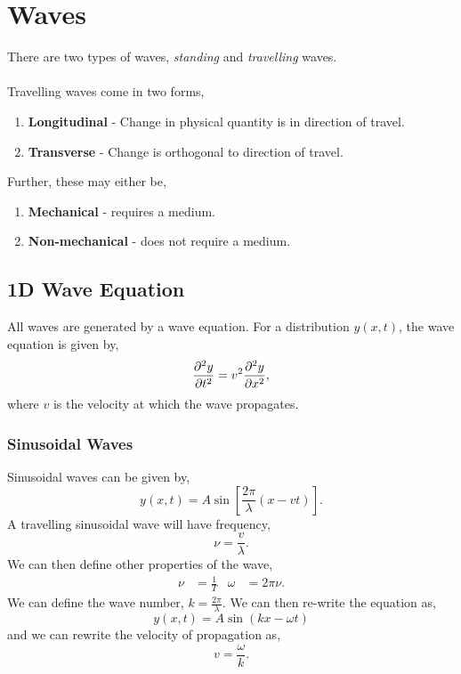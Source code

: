 \documentclass{book}
\begin{document}
\chapter{Waves}
There are two types of waves, \textit{standing} and \textit{travelling} waves. \\\\
Travelling waves come in two forms,
\begin{enumerate}
    \item \textbf{Longitudinal} - Change in physical quantity is in direction of travel.
    \item \textbf{Transverse} - Change is orthogonal to direction of travel. 
\end{enumerate}
Further, these may either be,
\begin{enumerate}
    \item \textbf{Mechanical} - requires a medium.
    \item \textbf{Non-mechanical} - does not require a medium.
\end{enumerate}
\section{1D Wave Equation}
All waves are generated by a wave equation. For a distribution $y(x,t)$, the wave equation is given by,
\begin{equation}
    \pdv[2]{y}{t} = v^2\pdv[2]{y}{x},
\end{equation}
where $v$ is the velocity at which the wave propagates.
\subsection{Sinusoidal Waves}
Sinusoidal waves can be given by,
\begin{equation}
    y(x,t) = A\sin\left[\frac{2\pi}{\lambda}(x-vt)\right].
\end{equation}
A travelling sinusoidal wave will have frequency,
\begin{equation}
    \nu = \frac{v}{\lambda}.
\end{equation}
We can then define other properties of the wave,
\begin{align}
    \nu & = \frac{1}{T} & \omega & = 2\pi\nu.
\end{align}
We can define the wave number, $k = \frac{2\pi}{\lambda}$. We can then re-write the equation as,
\begin{equation}
    y(x,t) = A\sin(kx - \omega t)
\end{equation}
and we can rewrite the velocity of propagation as,
\begin{equation}
    v = \frac{\omega}{k}.
\end{equation}
\end{document}
